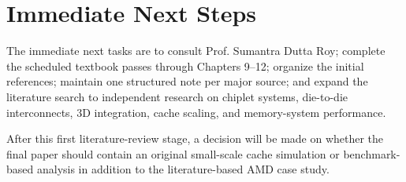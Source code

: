 \section{Immediate Next Steps}
\label{sec:next-steps}

The immediate next tasks are to consult Prof. Sumantra Dutta Roy; complete the scheduled textbook passes through Chapters 9--12; organize the initial references; maintain one structured note per major source; and expand the literature search to independent research on chiplet systems, die-to-die interconnects, 3D integration, cache scaling, and memory-system performance.

After this first literature-review stage, a decision will be made on whether the final paper should contain an original small-scale cache simulation or benchmark-based analysis in addition to the literature-based AMD case study.
